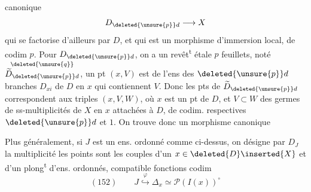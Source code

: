 canonique
\[
D_{\deleted{\unsure{p}}d}\longrightarrow X
\]
qui se factorise d'ailleurs par $D$, et qui est un morphisme d'immersion local, de codim $p$. Pour $D_{\deleted{\unsure{p}}d}$, on a un revêt\textsuperscript{t} étale  $p$ feuillets, noté $\overset{\deleted{\unsure{q}}}{\widetilde D_{\deleted{\unsure{p}}d}}$,  un pt $(x,V)$ est  de l'ens des $\deleted{\unsure{p}}d$ branches $D_{xi}$ de $D$ en $x$ qui contiennent $V$. Donc les  pts de $\widetilde D_{\deleted{\unsure{p}}d}$ correspondent aux triples $(x,V,W)$, où $x$ est un pt de $D$, et $V\subset W$ des germes de ss-multiplicités de $X$ en $x$ attachées à $D$, de codim. respectives $\deleted{\unsure{p}}d$ et $1$. On trouve donc un morphisme canonique

Plus généralement, si $J$ est un ens.  ordonné comme ci-dessus,  on  désigne par $D_J$ la  multiplicité  les points sont les couples d'un $x\in\deleted{D}\inserted{X}$  et d'un plong\textsuperscript{t} d'ens. ordonnés, compatible  fonctions codim
\[
(152)\qquad J\mathrel{\overset{\varphi}{\hookrightarrow}}\Delta_x\simeq\mathcal P(I(x))^\circ
\]
